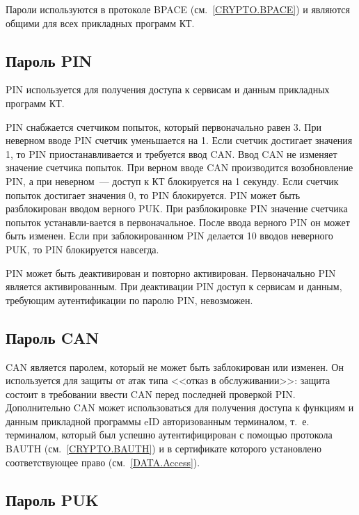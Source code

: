 Пароли используются в протоколе BPACE (см.~\ref{CRYPTO.BPACE})
и являются общими для всех прикладных программ КТ.

\subsection{Пароль PIN}\label{OBJ.PIN}

PIN используется для получения доступа к сервисам и данным прикладных 
программ КТ. 


PIN снабжается счетчиком попыток, который первоначально равен 3. При 
неверном вводе PIN счетчик уменьшается на 1. Если счетчик достигает 
значения 1, то PIN приостанавливается и требуется ввод CAN. Ввод CAN не 
изменяет значение счетчика попыток. При верном вводе CAN производится 
возобновление PIN, а при неверном~--- доступ к КТ блокируется на 1 секунду.
Если счетчик попыток достигает значения 0, то PIN 
блокируется. PIN может быть разблокирован вводом верного PUK. При 
разблокировке PIN значение счетчика попыток устанавли-вается в 
первоначальное. После ввода верного PIN он может быть изменен. Если при 
заблокированном PIN делается 10 вводов неверного PUK, то PIN блокируется 
навсегда. 

PIN может быть деактивирован и повторно активирован.
Первоначально PIN является активированным. При деактивации
PIN доступ к сервисам и данным, требующим аутентификации 
по паролю PIN, невозможен.

\subsection{Пароль CAN}\label{OBJ.CAN}

CAN является паролем, который не 
может быть заблокирован или изменен. Он используется для защиты от атак 
типа <<отказ в обслуживании>>: защита состоит в требовании ввести CAN перед 
последней проверкой PIN. Дополнительно CAN может использоваться для 
получения доступа к функциям и данным прикладной программы eID 
авторизованным терминалом, т.~е. терминалом, который был успешно 
аутентифицирован с помощью протокола BAUTH (см.~\ref{CRYPTO.BAUTH}) и в 
сертификате которого установлено соответствующее право (см.~\ref{DATA.Access}). 

\subsection{Пароль PUK}\label{OBJ.PUK}

